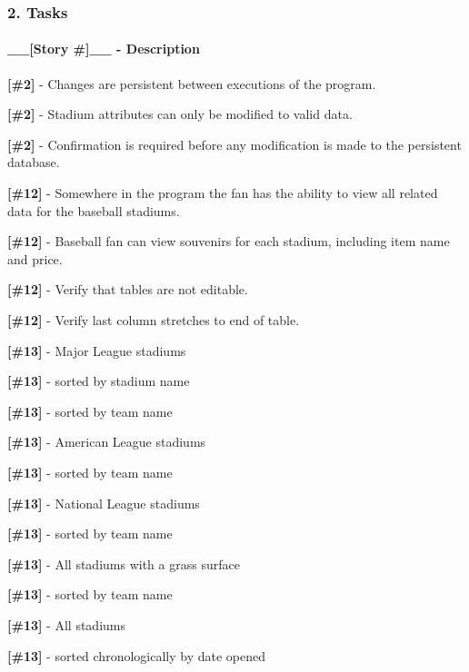 \subsubsection*{2. Tasks}

\paragraph*{\+\_\+\+\_\+\mbox{[}Story \#\mbox{]}\+\_\+\+\_\+ -\/ Description}

{\bfseries \mbox{[}\#2\mbox{]}} -\/ Changes are persistent between executions of the program.

{\bfseries \mbox{[}\#2\mbox{]}} -\/ Stadium attributes can only be modified to valid data.

{\bfseries \mbox{[}\#2\mbox{]}} -\/ Confirmation is required before any modification is made to the persistent database.

{\bfseries \mbox{[}\#12\mbox{]}} -\/ Somewhere in the program the fan has the ability to view all related data for the baseball stadiums.

{\bfseries \mbox{[}\#12\mbox{]}} -\/ Baseball fan can view souvenirs for each stadium, including item name and price.

{\bfseries \mbox{[}\#12\mbox{]}} -\/ Verify that tables are not editable.

{\bfseries \mbox{[}\#12\mbox{]}} -\/ Verify last column stretches to end of table.

{\bfseries \mbox{[}\#13\mbox{]}} -\/ Major League stadiums

{\bfseries \mbox{[}\#13\mbox{]}} -\/ sorted by stadium name

{\bfseries \mbox{[}\#13\mbox{]}} -\/ sorted by team name

{\bfseries \mbox{[}\#13\mbox{]}} -\/ American League stadiums

{\bfseries \mbox{[}\#13\mbox{]}} -\/ sorted by team name

{\bfseries \mbox{[}\#13\mbox{]}} -\/ National League stadiums

{\bfseries \mbox{[}\#13\mbox{]}} -\/ sorted by team name

{\bfseries \mbox{[}\#13\mbox{]}} -\/ All stadiums with a grass surface

{\bfseries \mbox{[}\#13\mbox{]}} -\/ sorted by team name

{\bfseries \mbox{[}\#13\mbox{]}} -\/ All stadiums

{\bfseries \mbox{[}\#13\mbox{]}} -\/ sorted chronologically by date opened

